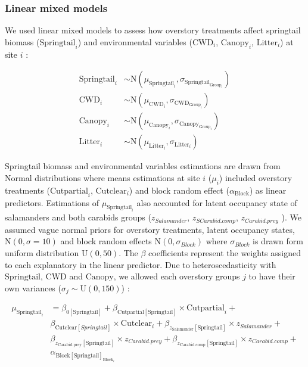\subsubsection{Linear mixed models} 

We used linear mixed models to assess how overstory treatments affect springtail biomass ($\text{Springtail}_{i}$) and 
environmental variables ($\text{CWD}_{i}$, $\text{Canopy}_{i}$, $\text{Litter}_{i}$) at site $i$ :

\begin{align}
  \text{Springtail}_{i} &\sim \text{N} (\mu_{\text{Springtail}_i}, \sigma_{\text{Springtail}_{\text{Group}_i}}) \nonumber \\
  \text{CWD}_{i} &\sim \text{N} (\mu_{\text{CWD}_i}, \sigma_{\text{CWD}_{\text{Group}_i}}) \\
  \text{Canopy}_{i} &\sim \text{N} (\mu_{\text{Canopy}_i}, \sigma_{\text{Canopy}_{\text{Group}_i}}) \nonumber \\
  \text{Litter}_{i} &\sim \text{N} (\mu_{\text{Litter}_i}, \sigma_{\text{Litter}_{i}}) \nonumber 
\end{align}

Springtail biomass and environmental variables estimations are drawn from Normal distributions where means estimations at site $i$ ($\mu_{i}$) included overstory treatments ($\text{Cutpartial}_i$, $\text{Cutclear}_i$) and block random effect ($\alpha_{\text{Block}}$) as linear predictors. 
Estimations of $\mu_{\text{Springtail}_i}$ also accounted for latent occupancy state of salamanders and both carabids groups ($z_{Salamander}$, $z_{SCarabid.comp}$, $z_{Carabid.prey}$ ). 
We assumed vague normal priors for overstory treatments, latent occupancy states, $\text{N}(0, \sigma = 10)$ and block random effects $\text{N}(0, \sigma_{Block})$ 
where $\sigma_{Block}$ is drawn form uniform distribution $\text{U}(0, 50)$. 
The $\beta$ coefficients represent the weights assigned to each explanatory in the linear predictor.
Due to heteroscedasticity with $\text{Springtail}$, $\text{CWD}$ and $\text{Canopy}$, we allowed each overstory groups $j$ to have their own variances ($\sigma_j \sim \text{U}(0,150)$) :

\begin{align}
  \mu_{\text{Springtail}_i} &= \beta_{0[\text{Springtail}]} + \beta_{\text{Cutpartial}[\text{Springtail}]} \times \text{Cutpartial}_i + \nonumber\\
  &\beta_{\text{Cutclear}[Springtail]} \times \text{Cutclear}_i + \beta_{z_{\text{Salamander}}[\text{Springtail}]} \times z_{Salamander} +  \nonumber\\
  &\beta_{z_{\text{Carabid.prey}}[\text{Springtail}]} \times z_{Carabid.prey} + \beta_{z_{\text{Carabid.comp}}[\text{Springtail}]} \times z_{Carabid.comp} + \nonumber\\
  &\alpha_{\text{Block}[\text{Springtail}]_{\text{Block}_i}} \nonumber
\end{align}

